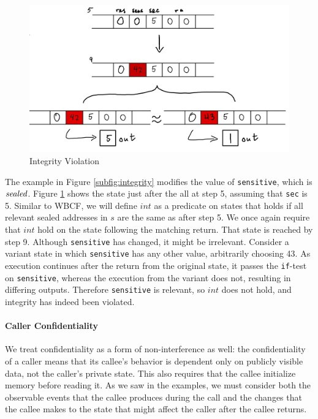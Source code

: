 \documentclass[10pt,conference]{ieeetran}%
\theoremstyle{definition}
\begin{document}
\begin{figure}
  \includegraphics[width=\columnwidth]{variants.png}
  \caption{Integrity Violation}
  \label{fig:variant}
\end{figure}

The example in Figure \ref{subfig:integrity} modifies the value of {\tt sensitive},
which is \(\mathit{sealed}\). Figure \ref{fig:variant} shows the state just after the all at step 5,
assuming that {\tt sec} is 5. Similar to WBCF, we will define
\(int\)  as a predicate on states that holds if
all relevant sealed addresses in \(s\) are the same as after step 5.
We once again require that \(int\) hold on the state following the matching return.
That state is reached by step 9. Although {\tt sensitive} has changed, it might be
irrelevant. Consider a variant state in which {\tt sensitive} has any other value, arbitrarily
choosing 43. As execution continues after the return from the original state, it
passes the {\tt if}-test on {\tt sensitive}, whereas the execution from the variant does not, resulting
in differing outputs. Therefore {\tt sensitive} is relevant, so \(int\) does not hold,
and integrity has indeed been violated.

\paragraph*{Caller Confidentiality}

We treat confidentiality as a form of non-interference as well: the confidentiality of a caller
means that its callee's behavior is dependent only on publicly visible data,
not the caller's private state. This also requires that the callee initialize
memory before reading it.
As we saw in the examples, we must consider both the observable events
that the callee produces during the call and the changes that the callee makes to the state that might
affect the caller after the callee returns.
\end{document}
